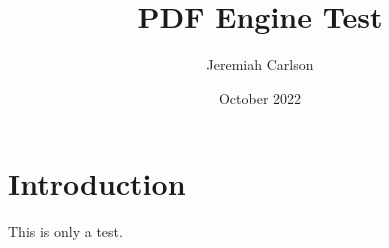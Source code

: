 \documentclass{article}
\title{PDF Engine Test}
\author{Jeremiah Carlson}
\date{October 2022}
\begin{document}
\maketitle

\section{Introduction}
\par
This is only a test.
\end{document}
